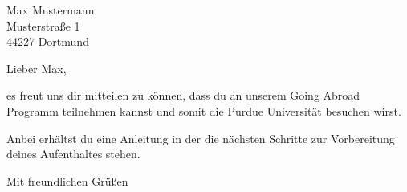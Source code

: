 \documentclass[
  pepbrief,
  fontsize=12pt,
  paper=a4,
  DIV=14,
  parskip=half,
  backaddress=false,
]{scrlttr2}
\author{Henning Moldenhauer}
\begin{document}
\begin{letter}{%
  Max Mustermann\\
  Musterstraße 1\\
  44227 Dortmund%
}
\opening{Lieber Max,}

es freut uns dir mitteilen zu können, dass du an unserem Going Abroad Programm
teilnehmen kannst und somit die Purdue Universität besuchen wirst.

Anbei erhältst du eine Anleitung in der die nächsten Schritte zur Vorbereitung
deines Aufenthaltes stehen.

\closing{Mit freundlichen Grüßen}

\end{letter}
\end{document}
